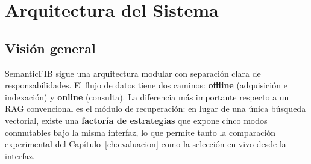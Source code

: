 \documentclass[12pt, a4paper, twoside]{report}
\begin{document}
\chapter{Arquitectura del Sistema}
\label{ch:arquitectura}

\section{Visi\'on general}

SemanticFIB sigue una arquitectura modular con separaci\'on clara de responsabilidades. El flujo de datos tiene dos caminos: \textbf{offline} (adquisici\'on e indexaci\'on) y \textbf{online} (consulta). La diferencia m\'as importante respecto a un RAG convencional es el m\'odulo de recuperaci\'on: en lugar de una \'unica b\'usqueda vectorial, existe una \textbf{factor\'ia de estrategias} que expone cinco modos conmutables bajo la misma interfaz, lo que permite tanto la comparaci\'on experimental del Cap\'itulo~\ref{ch:evaluacion} como la selecci\'on en vivo desde la interfaz.
\end{document}

